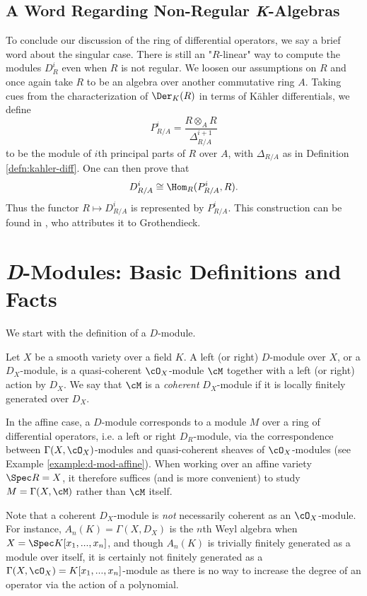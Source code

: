 \subsection{A Word Regarding Non-Regular \textit{K}-Algebras}
To conclude our discussion of the ring of differential operators, we say a brief word about the singular case. There is still an "$R$-linear" way to compute the modules $D^i_{R}$  even when $R$ is not regular. We loosen our assumptions on $R$ and once again take $R$ to be an algebra over another commutative ring $A$. Taking cues from the characterization of $\Der_K(R)$ in terms of K\"ahler differentials, we define
\begin{equation}\label{eqn:principal-parts}
	P^i_{R/A} = \frac{R\otimes_A R}{\Delta^{i+1}_{R/A}}
\end{equation}
to be the module of $i$th principal parts of $R$ over $A$, with $\Delta_{R/A}$ as in Definition \ref{defn:kahler-diff}. One can then prove that
\begin{align*}
	D^i_{R/A} \cong \Hom_R(P^i_{R/A}, R).
\end{align*}
Thus the functor $R\mapsto D^i_{R/A}$ is represented by $P^i_{R/A}$. This construction can be found in \cite{jet-spaces-exposition}, who attributes it to Grothendieck.

\newpage 

\section{\textit{D}-Modules: Basic Definitions and Facts}
\noindent We start with the definition of a $D$-module.
\begin{defn}\label{defn:D-modules}
	Let $X$ be a smooth variety over a field $K$. A left (or right) $D$-module over $X$, or a $D_X$-module, is a quasi-coherent $\cO_X$-module $\cM$ together with a left (or right) action by $D_X$. We say that $\cM$ is a \emph{coherent} $D_X$-module if it is locally finitely generated over $D_X$.
\end{defn}
In the affine case, a $D$-module corresponds to a module $M$ over a ring of differential operators, i.e. a left or right $D_{R}$-module, via the correspondence between $\Gamma(X,\cO_X)$-modules and quasi-coherent sheaves of $\cO_X$-modules (see Example \ref{example:d-mod-affine}). When working over an affine variety $\Spec R = X$, it therefore suffices (and is more convenient) to study $M = \Gamma(X,\cM)$ rather than $\cM$ itself.

Note that a coherent $D_X$-module is \emph{not} necessarily coherent as an $\cO_X$-module. For instance, $A_n(K) = \Gamma(X,D_X)$ is the $n$th Weyl algebra when $X = \Spec K[x_1,...,x_n]$, and though $A_n(K)$ is trivially finitely generated as a module over itself, it is certainly not finitely generated as a $\Gamma(X,\cO_X) = K[x_1,...,x_n]$-module as there is no way to increase the degree of an operator via the action of a polynomial.

